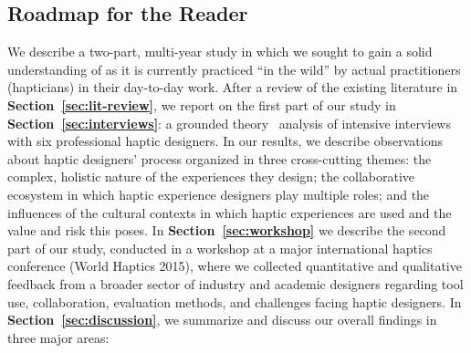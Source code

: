 \subsection{Roadmap for the Reader}
\noindent
We describe a two-part, multi-year study in which we sought to gain a solid understanding of
\haxd as it is currently practiced ``in the wild'' by actual practitioners (hapticians) in their day-to-day work.
After a review of the existing literature in \textbf{Section~\ref{sec:lit-review}},
we report on the first part of our study in \textbf{Section~\ref{sec:interviews}}: a grounded theory~\citep{Corbin2008} analysis of intensive interviews with six professional haptic designers.
In our results, we describe observations about haptic designers' process 
organized in three cross-cutting themes:
the complex, holistic nature of the experiences they design; 
the collaborative ecosystem in which haptic experience designers play multiple roles; 
and the influences of the cultural contexts in which haptic experiences are used and the value and risk this poses.
%
In \textbf{Section~\ref{sec:workshop}} we describe the second part of our study, conducted in a workshop at a major international haptics conference (World Haptics 2015), where we collected quantitative and qualitative feedback from a broader sector of industry and academic designers regarding tool use, collaboration, evaluation methods, and challenges facing haptic designers.
%
In \textbf{Section~\ref{sec:discussion}}, we summarize and discuss our overall findings in three major areas:
